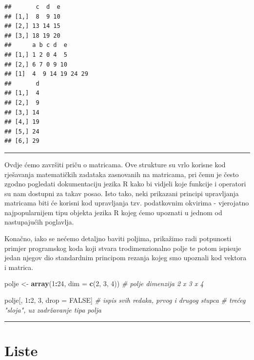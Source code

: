 \documentclass[]{book}
\newenvironment{Shaded}{\begin{snugshade}}{\end{snugshade}}
\newcommand{\KeywordTok}[1]{\textcolor[rgb]{0.13,0.29,0.53}{\textbf{#1}}}
\newcommand{\DataTypeTok}[1]{\textcolor[rgb]{0.13,0.29,0.53}{#1}}
\newcommand{\DecValTok}[1]{\textcolor[rgb]{0.00,0.00,0.81}{#1}}
\newcommand{\StringTok}[1]{\textcolor[rgb]{0.31,0.60,0.02}{#1}}
\newcommand{\CommentTok}[1]{\textcolor[rgb]{0.56,0.35,0.01}{\textit{#1}}}
\newcommand{\OtherTok}[1]{\textcolor[rgb]{0.56,0.35,0.01}{#1}}
\newcommand{\OperatorTok}[1]{\textcolor[rgb]{0.81,0.36,0.00}{\textbf{#1}}}
\newcommand{\NormalTok}[1]{#1}
\theoremstyle{definition}
\theoremstyle{definition}
\theoremstyle{definition}
\theoremstyle{remark}
\begin{document}
\begin{verbatim}
##       c  d  e
## [1,]  8  9 10
## [2,] 13 14 15
## [3,] 18 19 20
##      a b c d  e
## [1,] 1 2 0 4  5
## [2,] 6 7 0 9 10
## [1]  4  9 14 19 24 29
##       d
## [1,]  4
## [2,]  9
## [3,] 14
## [4,] 19
## [5,] 24
## [6,] 29
\end{verbatim}

\begin{center}\rule{0.5\linewidth}{\linethickness}\end{center}

Ovdje ćemo završiti priču o matricama. Ove strukture su vrlo korisne kod
rješavanja matematičkih zadataka zasnovanih na matricama, pri čemu je
često zgodno pogledati dokumentaciju jezika R kako bi vidjeli koje
funkcije i operatori su nam dostupni za takav posao. Isto tako, neki
prikazani principi upravljanja matricama biti će korisni kod upravljanja
tzv. podatkovnim okvirima - vjerojatno najpopularnijem tipu objekta
jezika R kojeg ćemo upoznati u jednom od nastupajućih poglavlja.

Konačno, iako se nećemo detaljno baviti poljima, prikažimo radi
potpunosti primjer programskog koda koji stvara trodimenzionalno polje
te potom ispisuje jedan njegov dio standardnim principom rezanja kojeg
smo upoznali kod vektora i matrica.

\begin{Shaded}
\begin{Highlighting}[]
\NormalTok{polje <-}\StringTok{ }\KeywordTok{array}\NormalTok{(}\DecValTok{1}\OperatorTok{:}\DecValTok{24}\NormalTok{, }\DataTypeTok{dim =} \KeywordTok{c}\NormalTok{(}\DecValTok{2}\NormalTok{, }\DecValTok{3}\NormalTok{, }\DecValTok{4}\NormalTok{))  }\CommentTok{# polje dimenzija 2 x 3 x 4}

\NormalTok{polje[, }\DecValTok{1}\OperatorTok{:}\DecValTok{2}\NormalTok{, }\DecValTok{3}\NormalTok{, drop =}\StringTok{ }\OtherTok{FALSE}\NormalTok{]           }\CommentTok{# ispis svih redaka, prvog i drugog stupca}
                                        \CommentTok{# trećeg "sloja", uz zadržavanje tipa polja}
\end{Highlighting}
\end{Shaded}

\begin{center}\rule{0.5\linewidth}{\linethickness}\end{center}

\section{Liste}\label{liste}
\end{document}
